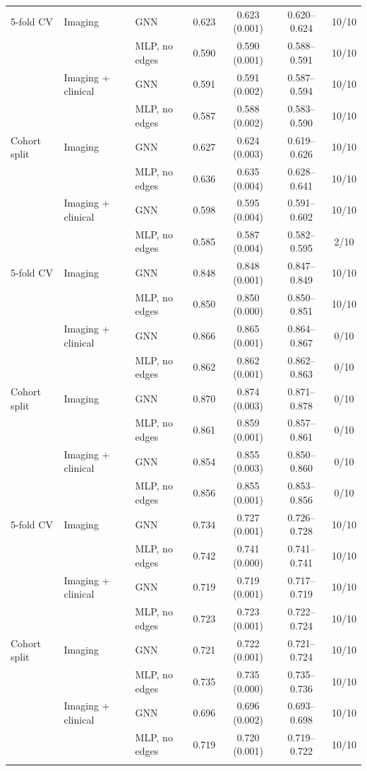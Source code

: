 \begin{tabularx}{\linewidth}{Q{2.1cm} Q{2.7cm} Q{2.4cm} C C C C}
\toprule
{} &  &  &  &  &  &  \\
\midrule
{}
5-fold CV & Imaging & GNN & 0.623 & 0.623 (0.001) & 0.620--0.624 & 10/10 \\
 &  & MLP, no edges & 0.590 & 0.590 (0.001) & 0.588--0.591 & 10/10 \\
 & Imaging + clinical & GNN & 0.591 & 0.591 (0.002) & 0.587--0.594 & 10/10 \\
 &  & MLP, no edges & 0.587 & 0.588 (0.002) & 0.583--0.590 & 10/10 \\
Cohort split & Imaging & GNN & 0.627 & 0.624 (0.003) & 0.619--0.626 & 10/10 \\
 &  & MLP, no edges & 0.636 & 0.635 (0.004) & 0.628--0.641 & 10/10 \\
 & Imaging + clinical & GNN & 0.598 & 0.595 (0.004) & 0.591--0.602 & 10/10 \\
 &  & MLP, no edges & 0.585 & 0.587 (0.004) & 0.582--0.595 & 2/10 \\
5-fold CV & Imaging & GNN & 0.848 & 0.848 (0.001) & 0.847--0.849 & 10/10 \\
 &  & MLP, no edges & 0.850 & 0.850 (0.000) & 0.850--0.851 & 10/10 \\
 & Imaging + clinical & GNN & 0.866 & 0.865 (0.001) & 0.864--0.867 & 0/10 \\
 &  & MLP, no edges & 0.862 & 0.862 (0.001) & 0.862--0.863 & 0/10 \\
Cohort split & Imaging & GNN & 0.870 & 0.874 (0.003) & 0.871--0.878 & 0/10 \\
 &  & MLP, no edges & 0.861 & 0.859 (0.001) & 0.857--0.861 & 0/10 \\
 & Imaging + clinical & GNN & 0.854 & 0.855 (0.003) & 0.850--0.860 & 0/10 \\
 &  & MLP, no edges & 0.856 & 0.855 (0.001) & 0.853--0.856 & 0/10 \\
5-fold CV & Imaging & GNN & 0.734 & 0.727 (0.001) & 0.726--0.728 & 10/10 \\
 &  & MLP, no edges & 0.742 & 0.741 (0.000) & 0.741--0.741 & 10/10 \\
 & Imaging + clinical & GNN & 0.719 & 0.719 (0.001) & 0.717--0.719 & 10/10 \\
 &  & MLP, no edges & 0.723 & 0.723 (0.001) & 0.722--0.724 & 10/10 \\
Cohort split & Imaging & GNN & 0.721 & 0.722 (0.001) & 0.721--0.724 & 10/10 \\
 &  & MLP, no edges & 0.735 & 0.735 (0.000) & 0.735--0.736 & 10/10 \\
 & Imaging + clinical & GNN & 0.696 & 0.696 (0.002) & 0.693--0.698 & 10/10 \\
 &  & MLP, no edges & 0.719 & 0.720 (0.001) & 0.719--0.722 & 10/10 \\
\botrule
\end{tabularx}
